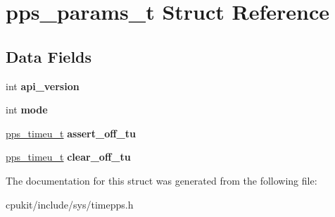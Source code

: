 \hypertarget{structpps__params__t}{}\section{pps\+\_\+params\+\_\+t Struct Reference}
\label{structpps__params__t}
\subsection*{Data Fields}
\begin{DoxyCompactItemize}
\item 
\mbox{\label{structpps__params__t_a44388e33655410f8de273a69548d5d48}} 
int {\bfseries api\+\_\+version}
\item 
\mbox{\label{structpps__params__t_a518748a45fd45104e56eded6ff882c7f}} 
int {\bfseries mode}
\item 
\mbox{\label{structpps__params__t_a97dc3f89e18558805caa3a2c25d1eea4}} 
\mbox{\hyperlink{unionpps__timeu}{pps\+\_\+timeu\+\_\+t}} {\bfseries assert\+\_\+off\+\_\+tu}
\item 
\mbox{\label{structpps__params__t_a3cfeee539dd17bb04808711005920f67}} 
\mbox{\hyperlink{unionpps__timeu}{pps\+\_\+timeu\+\_\+t}} {\bfseries clear\+\_\+off\+\_\+tu}
\end{DoxyCompactItemize}


The documentation for this struct was generated from the following file\+:\begin{DoxyCompactItemize}
\item 
cpukit/include/sys/timepps.\+h\end{DoxyCompactItemize}
